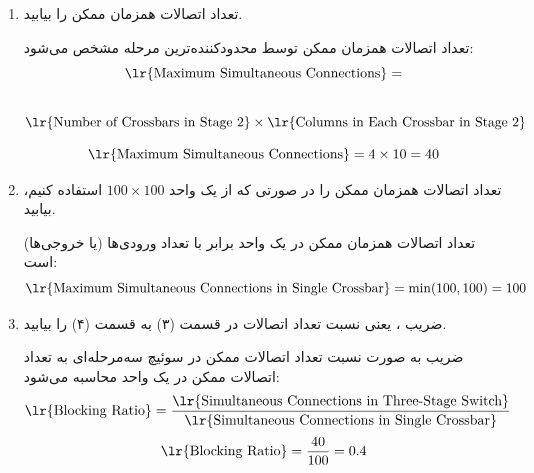 \begin{enumerate}
	\item 
	تعداد اتصالات همزمان ممکن را بیابید.
	
	\begin{qsolve}
		
		تعداد اتصالات همزمان ممکن توسط محدودکننده‌ترین مرحله مشخص می‌شود:
		$$\text{\lr{Maximum Simultaneous Connections}} =$$\\
		$\text{\lr{Number of Crossbars in Stage 2}} \times \text{\lr{Columns in Each Crossbar in Stage 2}}$

		\[
		\text{\lr{Maximum Simultaneous Connections}} = 4 \times 10 = 40
		\]
	\end{qsolve}
	
	
	\item 
	تعداد اتصالات همزمان ممکن را در صورتی که از یک  واحد $100 \times 100 $ استفاده کنیم، بیابید.
	\begin{qsolve}
		
		تعداد اتصالات همزمان ممکن در یک  واحد برابر با تعداد ورودی‌ها (یا خروجی‌ها) است:
		\[
		\text{\lr{Maximum Simultaneous Connections in Single Crossbar}} = \min(100, 100) = 100
		\]
	\end{qsolve}
	
	
	\item 
	ضریب ، یعنی نسبت تعداد اتصالات در قسمت (۳) به قسمت (۴) را بیابید.
	
	\begin{qsolve}
		    ضریب  به صورت نسبت تعداد اتصالات ممکن در سوئیچ سه‌مرحله‌ای به تعداد اتصالات ممکن در یک  واحد محاسبه می‌شود:
		\[
		\text{\lr{Blocking Ratio}} = \frac{\text{\lr{Simultaneous Connections in Three-Stage Switch}}}{\text{\lr{Simultaneous Connections in Single Crossbar}}}
		\]
		\[
		\text{\lr{Blocking Ratio}} = \frac{40}{100} = 0.4
		\]
		
	\end{qsolve}
\end{enumerate}

